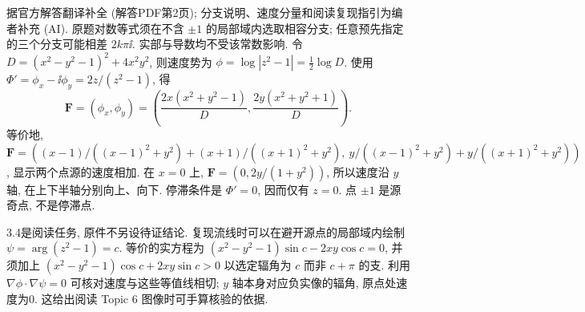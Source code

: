 \begin{solution}
据官方解答翻译补全 (解答PDF第2页); 分支说明、速度分量和阅读复现指引为编者补充 (AI). 原题对数等式须在不含 $\pm1$ 的局部域内选取相容分支; 任意预先指定的三个分支可能相差 $2k\pi\ii$. 实部与导数均不受该常数影响. 令 $D=(x^2-y^2-1)^2+4x^2y^2$, 则速度势为 $\phi=\log|z^2-1|=\frac12\log D$. 使用 $\Phi'=\phi_x-\ii\phi_y=2z/(z^2-1)$, 得
\[
\mathbf F=(\phi_x,\phi_y)=\left(\frac{2x(x^2+y^2-1)}D,\frac{2y(x^2+y^2+1)}D\right).
\]
等价地, $\mathbf F=( (x-1)/((x-1)^2+y^2)+(x+1)/((x+1)^2+y^2),\ y/((x-1)^2+y^2)+y/((x+1)^2+y^2))$, 显示两个点源的速度相加. 在 $x=0$ 上, $\mathbf F=(0,2y/(1+y^2))$, 所以速度沿 $y$ 轴, 在上下半轴分别向上、向下. 停滞条件是 $\Phi'=0$, 因而仅有 $z=0$. 点 $\pm1$ 是源奇点, 不是停滞点.

3.4是阅读任务, 原件不另设待证结论. 复现流线时可以在避开源点的局部域内绘制 $\psi=\arg(z^2-1)=c$. 等价的实方程为 $(x^2-y^2-1)\sin c-2xy\cos c=0$, 并须加上 $(x^2-y^2-1)\cos c+2xy\sin c>0$ 以选定辐角为 $c$ 而非 $c+\pi$ 的支. 利用 $\nabla\phi\cdot\nabla\psi=0$ 可核对速度与这些等值线相切; $y$ 轴本身对应负实像的辐角, 原点处速度为0. 这给出阅读 Topic 6 图像时可手算核验的依据.
\end{solution}
